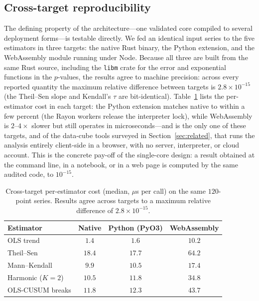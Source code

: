 \documentclass[review]{elsarticle}
\begin{document}
\subsection{Cross-target reproducibility}
\label{sec:crosstarget}
The defining property of the architecture---one validated core compiled to
several deployment forms---is testable directly. We fed an identical input
series to the five estimators in three targets: the native Rust binary, the
Python extension, and the WebAssembly module running under Node. Because all
three are built from the same Rust source, including the \texttt{libm} crate for
the error and exponential functions in the $p$-values, the results agree to
machine precision: across every reported quantity the maximum relative
difference between targets is $2.8\times10^{-15}$ (the Theil--Sen slope and
Kendall's $\tau$ are bit-identical). Table~\ref{tab:crosstarget} lists the
per-estimator cost in each target: the Python extension matches native to within
a few percent (the Rayon workers release the interpreter lock), while
WebAssembly is $2$--$4\times$ slower but still operates in microseconds---and is
the only one of these targets, and of the data-cube tools surveyed in
Section~\ref{sec:related}, that runs the analysis entirely client-side in a
browser, with no server, interpreter, or cloud account. This is the concrete
pay-off of the single-core design: a result obtained at the command line, in a
notebook, or in a web page is computed by the same audited code, to
$10^{-15}$.

\begin{table}[t]
\centering
\caption{Cross-target per-estimator cost (median, $\mu$s per call) on the same
$120$-point series. Results agree across targets to a maximum relative
difference of $2.8\times10^{-15}$.}
\label{tab:crosstarget}
\small
\begin{tabular}{@{}lccc@{}}
\toprule
Estimator & Native & Python (PyO3) & WebAssembly \\
\midrule
OLS trend          & $1.4$  & $1.6$  & $10.2$ \\
Theil--Sen         & $18.4$ & $17.7$ & $64.2$ \\
Mann--Kendall      & $9.9$  & $10.5$ & $17.4$ \\
Harmonic ($K{=}2$) & $10.5$ & $11.8$ & $34.8$ \\
OLS-CUSUM breaks   & $11.8$ & $12.3$ & $43.7$ \\
\bottomrule
\end{tabular}
\end{table}
\end{document}
